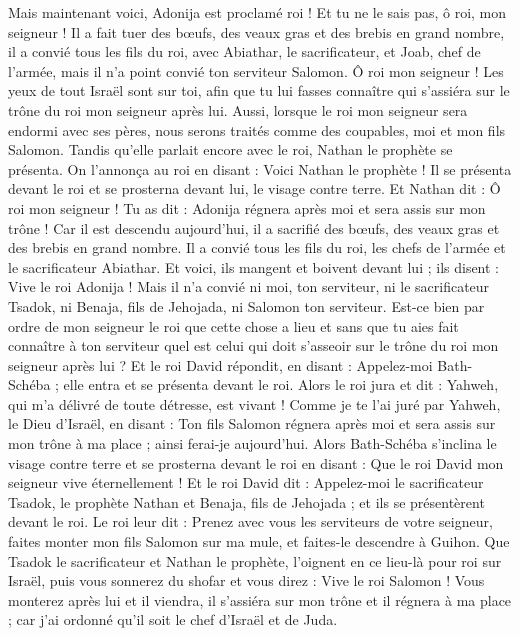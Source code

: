 \begin{multicols}{2}
Mais maintenant voici, Adonija est proclamé roi ! Et tu ne le sais pas, ô roi, mon seigneur !
Il a fait tuer des bœufs, des veaux gras et des brebis en grand nombre, il a convié tous les fils du roi, avec Abiathar, le sacrificateur, et Joab, chef de l'armée, mais il n'a point convié ton serviteur Salomon.
Ô roi mon seigneur ! Les yeux de tout Israël sont sur toi, afin que tu lui fasses connaître qui s’assiéra sur le trône du roi mon seigneur après lui.
Aussi, lorsque le roi mon seigneur sera endormi avec ses pères, nous serons traités comme des coupables, moi et mon fils Salomon.
Tandis qu’elle parlait encore avec le roi, Nathan le prophète se présenta.
On l’annonça au roi en disant : Voici Nathan le prophète ! Il se présenta devant le roi et se prosterna devant lui, le visage contre terre.
Et Nathan dit : Ô roi mon seigneur ! Tu as dit : Adonija régnera après moi et sera assis sur mon trône !
Car il est descendu aujourd'hui, il a sacrifié des bœufs, des veaux gras et des brebis en grand nombre. Il a convié tous les fils du roi, les chefs de l'armée et le sacrificateur Abiathar. Et voici, ils mangent et boivent devant lui ; ils disent : Vive le roi Adonija !
Mais il n'a convié ni moi, ton serviteur, ni le sacrificateur Tsadok, ni Benaja, fils de Jehojada, ni Salomon ton serviteur.
Est-ce bien par ordre de mon seigneur le roi que cette chose a lieu et sans que tu aies fait connaître à ton serviteur quel est celui qui doit s'asseoir sur le trône du roi mon seigneur après lui ?
Et le roi David répondit, en disant : Appelez-moi Bath-Schéba ; elle entra et se présenta devant le roi.
Alors le roi jura et dit : Yahweh, qui m'a délivré de toute détresse, est vivant !
Comme je te l'ai juré par Yahweh, le Dieu d'Israël, en disant : Ton fils Salomon régnera après moi et sera assis sur mon trône à ma place ; ainsi ferai-je aujourd'hui.
Alors Bath-Schéba s'inclina le visage contre terre et se prosterna devant le roi en disant : Que le roi David mon seigneur vive éternellement !
Et le roi David dit : Appelez-moi le sacrificateur Tsadok, le prophète Nathan et Benaja, fils de Jehojada ; et ils se présentèrent devant le roi.
Le roi leur dit : Prenez avec vous les serviteurs de votre seigneur, faites monter mon fils Salomon sur ma mule, et faites-le descendre à Guihon.
Que Tsadok le sacrificateur et Nathan le prophète, l'oignent en ce lieu-là pour roi sur Israël, puis vous sonnerez du shofar et vous direz : Vive le roi Salomon !
Vous monterez après lui et il viendra, il s'assiéra sur mon trône et il régnera à ma place ; car j'ai ordonné qu'il soit le chef d'Israël et de Juda.

\end{multicols}
